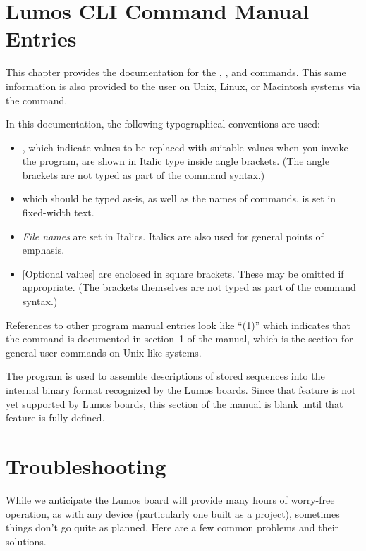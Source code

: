 \documentclass[letterpaper,twoside,onecolumn,openright,final]{memoir}
\begin{document}
\chapter{Lumos CLI Command Manual Entries}\label{ch:lumosctl}
This chapter provides the documentation for the , , and  commands.  
This same information is also
provided to the  user on Unix, Linux, or Macintosh systems via the  command.  

In this documentation, the following typographical conventions are used:
\begin{itemize}
	\item	{}, which indicate values to be replaced with suitable values when you
		invoke the program, are shown in Italic type inside angle brackets.  (The angle brackets
		are not typed as part of the command syntax.)
	\item	{} which should be typed as-is, as well as the names of commands, is set
		in fixed-width text.
	\item	\emph{File names} are set in Italics.  Italics are also used for general points of emphasis.
	\item	{}[Optional values] are enclosed in square brackets.  These may be omitted if appropriate.
		(The brackets themselves are not typed as part of the command syntax.)
\end{itemize}
References to other program manual entries look like ``(1)'' which indicates that the
 command is documented in section~1 of the manual, which is the section for general 
user commands on Unix-like systems.
\newpage
{}
\begin{NotImplemented*}{The  program is used to assemble descriptions of stored
sequences into the internal binary format recognized by the Lumos boards.  Since that feature is
not yet supported by Lumos boards, this section of the manual is blank until that feature is
fully defined.}
%
\end{NotImplemented*}
\newpage
{}

\newpage
{}
\label{man:lumosupgrade}

\chapter{Troubleshooting}
While we anticipate the Lumos board will provide many hours of worry-free operation,
as with any device (particularly one built as a  project), sometimes things don't go
quite as planned.  Here are a few common problems and their solutions.
\end{document}
